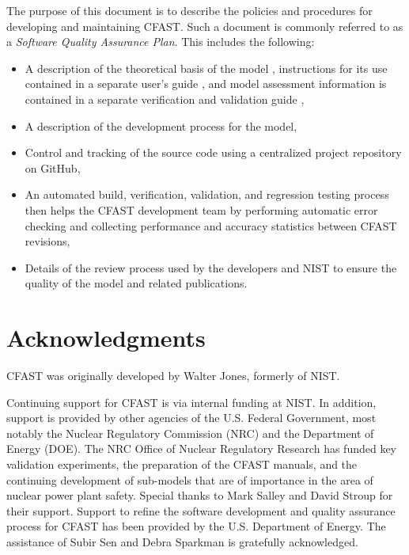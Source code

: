\documentclass[12pt]{book}
\begin{document}
The purpose of this document is to describe the policies and procedures for developing and maintaining CFAST. Such a document is commonly referred to as a {\em Software Quality Assurance Plan}.  This includes the following:

\begin{itemize}
    \item A description of the theoretical basis of the model \cite{CFAST_Tech_Guide_8}, instructions for its use contained in a separate user's guide \cite{CFAST_Users_Guide_8}, and model assessment information is contained in a separate verification and validation guide \cite{CFAST_Valid_Guide_8},
    
    \item A description of the development process for the model,
    
    \item Control and tracking of the source code using a centralized project repository on GitHub,
    
    \item An automated build, verification, validation, and regression testing process then helps the CFAST development team by performing automatic error checking and collecting performance and accuracy statistics between CFAST revisions,
    
    \item Details of the review process used by the developers and NIST to ensure the quality of the model and related publications.
    
\end{itemize}





\chapter{Acknowledgments}

\label{acksection}

CFAST was originally developed by Walter Jones, formerly of NIST.

Continuing support for CFAST is via internal funding at NIST. In addition, support is provided by other agencies of the U.S. Federal Government, most notably the Nuclear Regulatory Commission (NRC) and the Department of Energy (DOE). The NRC Office of Nuclear Regulatory Research has funded key validation experiments, the preparation of the CFAST manuals, and the continuing development of sub-models that are of importance in the area of nuclear power plant safety. Special thanks to Mark Salley and David Stroup for their support. Support to refine the software development and quality assurance process for CFAST has been provided by the U.S. Department of Energy. The assistance of Subir Sen and Debra Sparkman is gratefully acknowledged.
\end{document}
